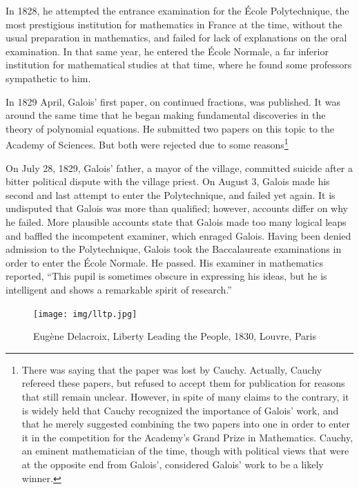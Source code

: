 \documentclass[b5paper]{article}
\begin{document}
In 1828, he attempted the entrance examination for the École Polytechnique, the most prestigious institution for mathematics in France at the time, without the usual preparation in mathematics, and failed for lack of explanations on the oral examination. In that same year, he entered the École Normale, a far inferior institution for mathematical studies at that time, where he found some professors sympathetic to him.

In 1829 April, Galois' first paper, on continued fractions, was published. It was around the same time that he began making fundamental discoveries in the theory of polynomial equations. He submitted two papers on this topic to the Academy of Sciences. But both were rejected due to some reasons\footnote{There was saying that the paper was lost by Cauchy. Actually, Cauchy refereed these papers, but refused to accept them for publication for reasons that still remain unclear. However, in spite of many claims to the contrary, it is widely held that Cauchy recognized the importance of Galois' work, and that he merely suggested combining the two papers into one in order to enter it in the competition for the Academy's Grand Prize in Mathematics. Cauchy, an eminent mathematician of the time, though with political views that were at the opposite end from Galois', considered Galois' work to be a likely winner\cite{Wiki-Galois}.}

On July 28, 1829, Galois' father, a mayor of the village, committed suicide after a bitter political dispute with the village priest\cite{Wiki-Galois}. On August 3, Galois made his second and last attempt to enter the Polytechnique, and failed yet again. It is undisputed that Galois was more than qualified; however, accounts differ on why he failed. More plausible accounts state that Galois made too many logical leaps and baffled the incompetent examiner, which enraged Galois. Having been denied admission to the Polytechnique, Galois took the Baccalaureate examinations in order to enter the École Normale. He passed. His examiner in mathematics reported, ``This pupil is sometimes obscure in expressing his ideas, but he is intelligent and shows a remarkable spirit of research.''

\begin{figure}[htbp]
 \centering
 \texttt{[image: img/lltp.jpg]}
 \captionsetup{labelformat=empty}
 \caption{Eugène Delacroix, Liberty Leading the People, 1830, Louvre, Paris}
 \label{fig:Liberty-Leading-the-People}
\end{figure}
\end{document}
